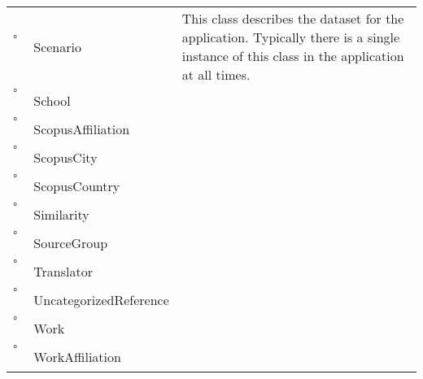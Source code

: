 \begin{longtable}{llp{8cm}}
$\square$\ & Scenario & This class describes the dataset for the application. Typically there is a single instance of this class in the application at all times. \\
$\square$\ & School &  \\
$\square$\ & ScopusAffiliation &  \\
$\square$\ & ScopusCity &  \\
$\square$\ & ScopusCountry &  \\
$\square$\ & Similarity &  \\
$\square$\ & SourceGroup &  \\
$\square$\ & Translator &  \\
$\square$\ & UncategorizedReference &  \\
$\square$\ & Work &  \\
$\square$\ & WorkAffiliation &  \\
\end{longtable}
